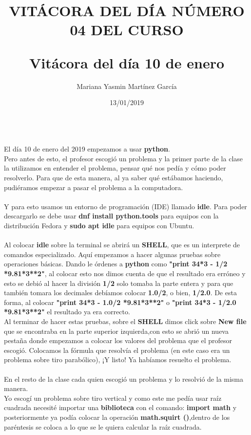\documentclass[letterpaper, 12pt, twoside]{article}
\title{\Huge\item\color{red}\textbf {VITÁCORA DEL DÍA NÚMERO 04 DEL CURSO}}
\author{Mariana Yasmin Martínez García}
\date{13/01/2019}
\begin{document}
	\maketitle
	
	\newpage
	\title{\huge\textbf{Vitácora del día 10 de enero\\}} \\
	El día 10 de enero del 2019 empezamos a usar \textbf{python}. \\
	Pero antes de esto, el profesor escogió un problema y la primer parte de la clase la utilizamos en entender el problema, pensar qué nos pedía y cómo poder resolverlo. Para que de esta manera, al ya saber qué estábamos haciendo, pudiéramos empezar a pasar el problema a la computadora. \\ \\
	Y para esto usamos un entorno de programación (IDE) llamado \textbf{idle}. Para poder descargarlo se debe usar \textbf{dnf install python.tools} para equipos con la distribución Fedora y \textbf{sudo apt idle} para equipos con Ubuntu. \\ \\
	Al colocar \textbf{idle} sobre la terminal se abrirá un \textbf{SHELL}, que es un interprete de comandos especializado. Aquí empezamos a hacer algunas pruebas sobre operaciones básicas. Dando le órdenes a \textbf{python} como \textbf{"print  34*3 - 1/2 *9.81*3**2"}, al colocar esto nos dimos cuenta de que el resultado era erróneo y esto se debió al hacer la división \textbf{1/2} solo tomaba la parte entera y para que también tomara los decimales debíamos colocar \textbf{1.0/2}, o bien, \textbf{1/2.0}. De esta forma, al colocar \textbf{"print  34*3 - 1.0/2 *9.81*3**2"} o \textbf{"print  34*3 - 1/2.0 *9.81*3**2"} el resultado ya era correcto.\\
	Al terminar de hacer estas pruebas, sobre el \textbf{SHELL} dimos click sobre \textbf{New file} que se encontraba en la parte superior izquierda,con esto se abrió un nueva pestaña donde empezamos a colocar los valores del problema que el profesor escogió. Colocamos la fórmula que resolvía el problema (en este caso era un problema sobre tiro parabólico), ¡Y listo! Ya habíamos resuelto el problema. \\ \\
	En el resto de la clase cada quien escogió un problema y lo resolvió de la misma manera. \\
	Yo escogí un problema sobre tiro vertical y como este me pedía usar raíz cuadrada necesité importar una \textbf{biblioteca} con el comando: \textbf{import math } y posteriormente ya podía colocar la operación \textbf{math.squirt ()},dentro de los paréntesis se coloca a lo que se le quiera calcular la raíz cuadrada.
	
\end{document}
